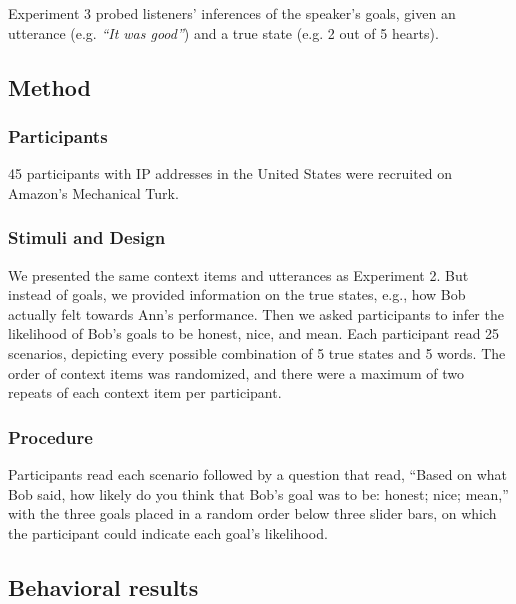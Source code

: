 \documentclass[10pt,letterpaper]{article}
\begin{document}
Experiment 3 probed listeners' inferences of the speaker's goals, given an utterance (e.g. \emph{``It was good''}) and a true state (e.g. 2 out of 5 hearts).

\subsection{Method}

\subsubsection{Participants}

45 participants with IP addresses in the United States were recruited on Amazon's Mechanical Turk.


\subsubsection{Stimuli and Design}

We presented the same context items and utterances as Experiment 2.
But instead of goals, we provided information on the true states, e.g., how Bob actually felt towards Ann's performance.
Then we asked participants to infer the likelihood of Bob's goals to be honest, nice, and mean.
Each participant read 25 scenarios, depicting every possible combination of 5 true states and 5 words.
The order of context items was randomized, and there were a maximum of two repeats of each context item per participant.

\subsubsection{Procedure}
Participants read each scenario followed by a question that read, ``Based on what Bob said, how likely do you think that Bob's goal was to be: honest; nice; mean,'' with the three goals placed in a random order below three slider bars, on which the participant could indicate each goal's likelihood.



\subsection{Behavioral results}
\end{document}
